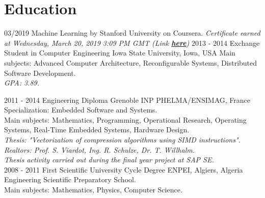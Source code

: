 \documentclass[]{friggeri-cv}
\begin{document}
\section{Education}
  \begin{entrylist}
  \entry
    {03/2019}
    {Machine Learning by Stanford University on Coursera.}
    {}
    {\emph{Certificate earned at Wednesday, March 20, 2019 3:09 PM GMT (Link \href{https://www.coursera.org/account/accomplishments/certificate/XAWSYCH46GSE}{\textbf{here}})}}
  \entry
    {2013 - 2014}
    {Exchange Student in Computer Engineering}
    {Iowa State University, Iowa, USA}
    {Main subjects: Advanced Computer Architecture, Reconfigurable Systems, Distributed Software Development.\\
    \emph{GPA: 3.89.}\\}

  \entry
    {2011 - 2014}
    {Engineering Diploma}
    {Grenoble INP PHELMA/ENSIMAG, France}
    {Specialization: Embedded Software and Systems.\\
    Main subjects: Mathematics, Programming, Operational Research, Operating Systems, Real-Time Embedded Systems, Hardware Design.\\
    \emph{Thesis: "Vectorization of compression algorithms using SIMD instructions".}\\
    \emph{Realtors: Prof. S. Viardot, Ing. R. Schulze, Dr. T. Willhalm.}\\
    \emph{Thesis activity carried out during the final year project at SAP SE.}\\}
  \entry
    {2008 - 2011}
    {First Scientific University Cycle Degree}
    {ENPEI, Algiers, Algeria}
    {Engineering Scientific Preparatory School.\\
    Main subjects: Mathematics, Physics, Computer Science.}
\end{entrylist}
\end{document}
